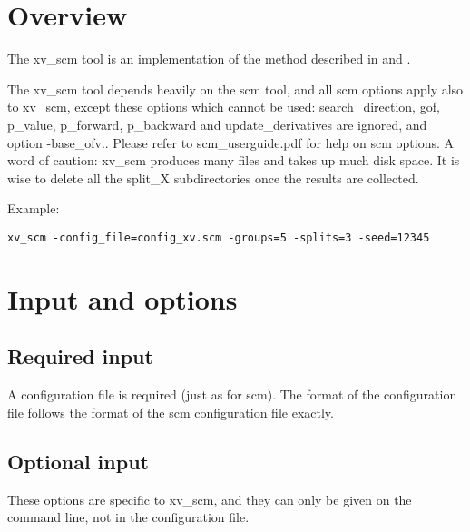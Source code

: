 



\maketitle


\section{Overview}
The xv\_scm tool is an implementation of the method described in \cite{Katsube1} and \cite{Katsube2}. 

The xv\_scm tool depends heavily on the scm tool, and all scm options apply also to xv\_scm, except these options which cannot be used:
search\_direction, gof, p\_value, p\_forward, p\_backward and update\_derivatives are ignored, and option -base\_ofv.. Please refer to scm\_userguide.pdf for help on scm options.
A word of caution: xv\_scm produces many files and takes up much disk space. It is wise to delete all the split\_X subdirectories once the results are collected.

Example:
\begin{verbatim}
xv_scm -config_file=config_xv.scm -groups=5 -splits=3 -seed=12345
\end{verbatim}

\section{Input and options}

\subsection{Required input}
A configuration file is required (just as for scm).  The format of the configuration file follows the format of the scm configuration file exactly.

\subsection{Optional input}

These options are specific to xv\_scm, and they can only be given on the command line, not in the configuration file.

